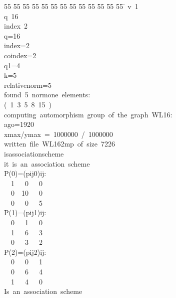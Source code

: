 %
%
\begin{tabbing}
55 \= 55 \= 55 \= 55 \= 55 \= 55 \= 55 \= 55 \= 55 \= 55 \= 55 \= 55 \= 55 \= \kill
{}v\ 1\\[0pt]
q\ 16\\[0pt]
index\ 2\\[0pt]
q=16\\[0pt]
index=2\\[0pt]
coindex=2\\[0pt]
q1=4\\[0pt]
k=5\\[0pt]
relativenorm=5\\[0pt]
found\ 5\ normone\ elements:\\[0pt]
(\ 1\ 3\ 5\ 8\ 15\ )\\[0pt]
computing\ automorphism\ group\ of\ the\ graph\ WL16:\\[0pt]
ago=1920\\[0pt]
xmax/ymax\ =\ 1000000\ /\ 1000000\\[0pt]
written\ file\ WL162mp\ of\ size\ 7226\\[0pt]
isassociationscheme\\[0pt]
it\ is\ an\ association\ scheme\\[0pt]
P(0)=(pij0)ij:\\[0pt]
\ \ 1\ \ \ 0\ \ \ 0\ \\[0pt]
\ \ 0\ \ 10\ \ \ 0\ \\[0pt]
\ \ 0\ \ \ 0\ \ \ 5\ \\[0pt]
P(1)=(pij1)ij:\\[0pt]
\ \ 0\ \ \ 1\ \ \ 0\ \\[0pt]
\ \ 1\ \ \ 6\ \ \ 3\ \\[0pt]
\ \ 0\ \ \ 3\ \ \ 2\ \\[0pt]
P(2)=(pij2)ij:\\[0pt]
\ \ 0\ \ \ 0\ \ \ 1\ \\[0pt]
\ \ 0\ \ \ 6\ \ \ 4\ \\[0pt]
\ \ 1\ \ \ 4\ \ \ 0\ \\[0pt]
Is\ an\ association\ scheme\\[0pt]
\end{tabbing}
